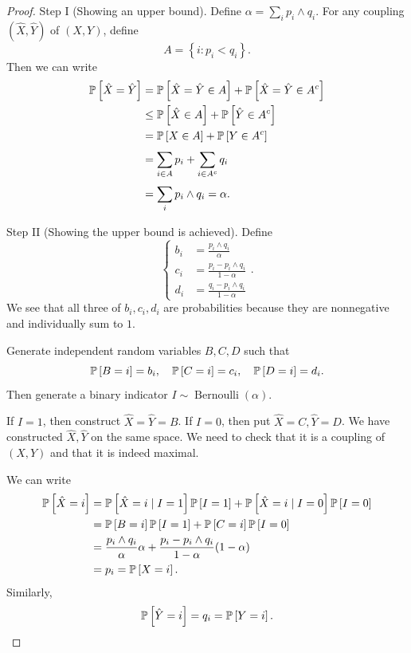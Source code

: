 \begin{proof}
	Step I (Showing an upper bound).
	Define $\alpha = \sum_{i}^{} p_i \wedge q_i$. For any coupling $(\hat{X}, \hat{Y})$ of $(X,Y)$, define \[
		A = \left\{i: p_i < q_i\right\}
	.\] Then we can write 
	\begin{align*}
		\P\left[\hat{X} = \hat{Y}\right] 
		&= \P\left[\hat{X} = \hat{Y} \in A\right] + \P\left[\hat{X}= \hat{Y} \in A^{c}\right] \\
		&\le \P\left[\hat{X} \in A\right] + \P\left[\hat{Y} \in A^{c}\right] \\
		&= \P\left[X \in A\right] + \P\left[Y \in A^{c}\right] \\
		&= \sum\limits_{i\in A}^{} p_i + \sum\limits_{i\in A^{c}}^{} q_i \\
		&= \sum\limits_{i}^{} p_i \wedge q_i = \alpha
	.\end{align*}

	Step II (Showing the upper bound is achieved). 
	Define \[
		\begin{cases}
			b_i &= \frac{p_i \wedge q_i}{\alpha} \\
			c_i &= \frac{p_i - p_i \wedge q_i}{1-\alpha} \\
			d_i &= \frac{q_i - p_i \wedge q_i}{1-\alpha}
		\end{cases}
	.\] We see that all three of $b_i,c_i,d_i$ are probabilities because they are nonnegative and individually sum to $1$.
	
	Generate independent random variables $B,C,D$ such that \[
		\P\left[B = i\right] = b_i, \quad \P\left[C = i\right]  = c_i, \quad \P\left[D = i\right]  = d_i
	.\] Then generate a binary indicator $I \sim \operatorname{Bernoulli}(\alpha)$.

	If $I = 1$, then construct $\hat{X}= \hat{Y} = B$. If $I = 0$, then put $\hat{X} = C, \hat{Y} = D$. We have constructed $\hat{X},\hat{Y}$ on the same space. We need to check that it is a coupling of $(X,Y)$ and that it is indeed maximal.

	We can write
	\begin{align*}
		\P\left[\hat{X} = i\right] 
		&= \P\left[\hat{X} =  i\mid I = 1\right] \P\left[I = 1\right]  + \P\left[\hat{X} = i \mid I = 0\right] \P\left[I = 0\right] \\
		&= \P\left[B=i\right] \P\left[I = 1\right] + \P\left[C= i\right] \P\left[I=0\right] \\
		&= \frac{p_i \wedge q_i}{\alpha}\alpha + \frac{p_i - p_i \wedge q_i}{1-\alpha}(1-\alpha) \\
		&= p_i = \P\left[X = i\right] 
	.\end{align*}
	Similarly, \[
		\P\left[\hat{Y} = i\right] = q_i = \P\left[Y = i\right] 
	.\] 


\end{proof}
